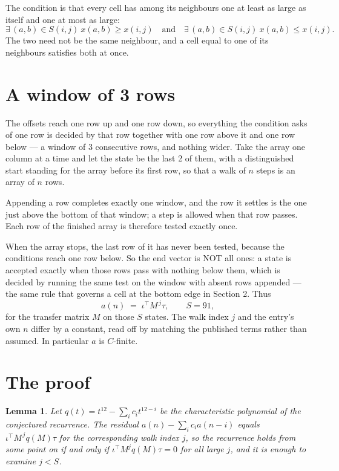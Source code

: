\documentclass[11pt,a4paper]{article}
\theoremstyle{plain}
\newtheorem{lemma}[theorem]{Lemma}
\theoremstyle{definition}
\begin{document}
The condition is that every cell has among its neighbours one at least as large as itself and one at most as large:
\[
\exists\,(a,b)\in S(i,j)\ x(a,b)\ge x(i,j)\quad\text{and}\quad\exists\,(a,b)\in S(i,j)\ x(a,b)\le x(i,j).
\]
The two need not be the same neighbour, and a cell equal to one of its neighbours satisfies both at once.

\section{A window of 3 rows}

The offsets reach one row up and one row down, so everything the condition asks of one row is
decided by that row together with one row above it and one row below --- a window of
$3$ consecutive rows, and nothing wider. Take the array one column at a time and
let the state be the last 2 of them, with a distinguished start standing for the array before its
first row, so that a walk of $n$ steps is an array of $n$ rows.

Appending a row completes exactly one window, and the row it settles is the one just above the bottom of that window; a step is
allowed when that row passes. Each row of the finished array is therefore tested exactly once.

When the array stops, the last row of it has never been tested, because the
conditions reach one row below. So the end vector is NOT all ones: a state is accepted exactly when
those rows pass with nothing below them, which is decided by running the same test on the window
with absent rows appended --- the same rule that governs a cell at the bottom edge in
Section 2.
Thus
\[
a(n)\;=\;\iota^{\!\top}M^{\,j}\tau ,\qquad S=91,
\]
for the transfer matrix $M$ on those $S$ states. The walk index $j$ and the entry's own $n$
differ by a constant, read off by matching the published terms rather than assumed. In
particular $a$ is $C$-finite.

\section{The proof}

\begin{lemma}\label{lem:crit}
Let $q(t)=t^{12}-\sum_i c_it^{12-i}$ be the characteristic polynomial of the
conjectured recurrence. The residual $a(n)-\sum_ic_ia(n-i)$ equals
$\iota^{\!\top}M^{\,j}q(M)\tau$ for the corresponding walk index $j$, so the recurrence
holds from some point on if and only if $\iota^{\!\top}M^{j}q(M)\tau=0$ for all large $j$,
and it is enough to examine $j<S$.
\end{lemma}
\end{document}
